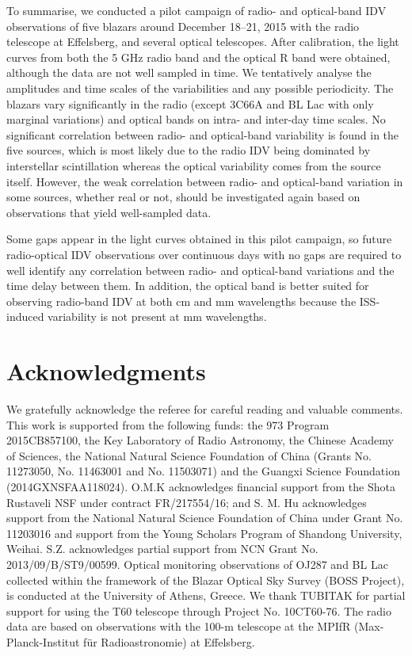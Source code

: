 \documentclass[a4paper,fleqn,usenatbib]{mnras}
\begin{document}
To summarise, we conducted a pilot campaign of radio- and optical-band IDV observations of five blazars around December 18--21, 2015 with the radio telescope at Effelsberg, and several optical telescopes. After calibration, the light curves from both the 5 GHz radio band and the optical R band were obtained, although the data are not well sampled in time. We tentatively analyse the amplitudes and time scales of the variabilities and any possible periodicity. The blazars vary significantly in the radio (except 3C66A and BL Lac with only marginal variations) and optical bands on intra- and inter-day time scales. No significant correlation between radio- and optical-band variability is found in the five sources, which is most likely due to the radio IDV being dominated by interstellar scintillation whereas the optical variability comes from the source itself. However, the weak correlation between radio- and optical-band variation in some sources, whether real or not, should be investigated again based on observations that yield well-sampled data.


Some gaps appear in the light curves obtained in this pilot campaign, so future radio-optical IDV observations over continuous days with no gaps are required to well identify any correlation between radio- and optical-band variations and the time delay between them. In addition, the optical band is better suited for observing radio-band IDV at both cm and mm wavelengths because the ISS-induced variability is not present at mm wavelengths.



\section*{Acknowledgments}

We gratefully acknowledge the referee for careful reading and valuable comments. This work is supported from the following funds: the 973 Program 2015CB857100, the Key Laboratory of Radio Astronomy, the Chinese Academy of Sciences, the National Natural Science Foundation of China (Grants No. 11273050, No. 11463001 and No. 11503071) and the Guangxi Science Foundation (2014GXNSFAA118024). O.M.K acknowledges financial support from the Shota Rustaveli NSF under contract FR/217554/16; and S. M. Hu acknowledges support from the National Natural Science Foundation of China under Grant No. 11203016 and support from the Young Scholars Program of Shandong University, Weihai. S.Z. acknowledges partial support from  NCN Grant No. 2013/09/B/ST9/00599. Optical monitoring observations of OJ287 and BL Lac collected within the framework of the Blazar Optical Sky Survey (BOSS Project), is conducted at the University of Athens, Greece. We thank TUBITAK for partial support for using the T60 telescope through Project No. 10CT60-76. The radio data are based on observations with the 100-m telescope at the MPIfR (Max-Planck-Institut f\"ur Radioastronomie) at Effelsberg.
\end{document}
